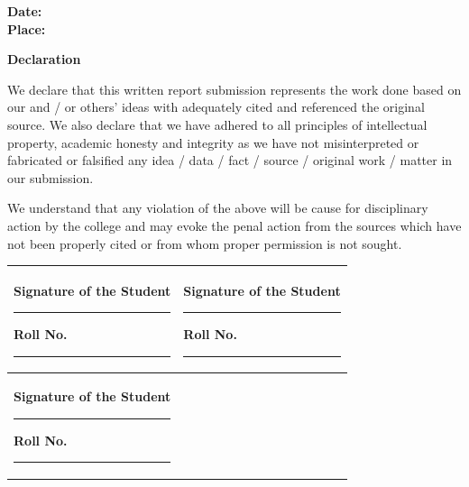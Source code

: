 \noindent\textbf{Date:}\\
\noindent\textbf{Place:} \PlaceCity

\clearpage

\begin{center}
    {\Large\bfseries\color{Eclipse} \University\par}
    \vspace{4pt}
    {\Large\bfseries \College\par}
    \vspace{30pt}
    {\Huge\bfseries\color{Cardinal} Declaration\par}
\end{center}

\vspace{12pt}

We declare that this written report submission represents the work done based
on our and / or others' ideas with adequately cited and referenced the
original source. We also declare that we have adhered to all principles of
intellectual property, academic honesty and integrity as we have not
misinterpreted or fabricated or falsified any idea / data / fact / source /
original work / matter in our submission.

\vspace{6pt}

We understand that any violation of the above will be cause for disciplinary
action by the college and may evoke the penal action from the sources which
have not been properly cited or from whom proper permission is not sought.

\vspace{30pt}

\renewcommand{\arraystretch}{2.4}
\begin{tabular}{|p{}|p{}|}
    \hline
    \textbf{Signature of the Student} \newline\rule{6cm}{0.4pt}\newline
    \textbf{Roll No.} \rule{4cm}{0.4pt} &
    \textbf{Signature of the Student} \newline\rule{6cm}{0.4pt}\newline
    \textbf{Roll No.} \rule{4cm}{0.4pt} \\ \hline
        \textbf{Signature of the Student} \newline\rule{6cm}{0.4pt}\newline
    \textbf{Roll No.} \rule{4cm}{0.4pt} & \\ \hline
\end{tabular}
\renewcommand{\arraystretch}{1.0}

